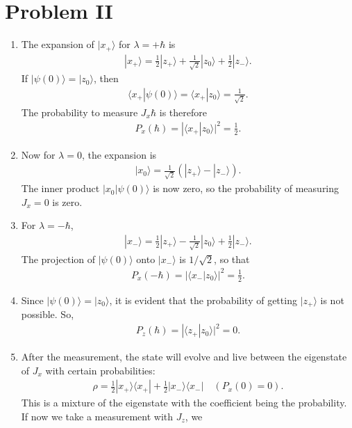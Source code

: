 \documentclass[letterpaper,11pt,twoside]{article}
\newcommand{\ket}[1]{|#1\rangle}
\newcommand{\bra}[1]{\langle#1|}
\newcommand{\braket}[1]{\langle#1\rangle}
\begin{document}
\section*{Problem II}
\begin{enumerate}[itemsep=0pt,topsep=0pt,label=\alph*)]
  \item The expansion of $\ket{x_+}$ for $\lambda=+\hbar$ is 
  \begin{align*}
    \ket{x_+}=\frac{1}{2}\ket{z_+}+\frac{1}{\sqrt{2}}\ket{z_0}+\frac{1}{2}\ket{z_-}.
  \end{align*}
  If $\ket{\psi(0)}=\ket{z_0}$, then 
  \begin{align*}
    \braket{x_+|\psi(0)}=\braket{x_+|z_0}=\frac{1}{\sqrt{2}}.
  \end{align*}
  The probability to measure $J_x\hbar$ is therefore 
  \begin{align*}
    P_x(\hbar)=|\braket{x_+|z_0}|^2=\frac{1}{2}.
  \end{align*}
  \item Now for $\lambda=0$, the expansion is 
  \begin{align*}
    \ket{x_0}=\frac{1}{\sqrt{2}}(\ket{z_+}-\ket{z_-}).
  \end{align*}
  The inner product $\ket{x_0|\psi(0)}$ is now zero, so the probability of measuring $J_x=0$ is zero.
  \item For $\lambda=-\hbar$, 
  \begin{align*}
    \ket{x_-}=\frac{1}{2}\ket{z_+}-\frac{1}{\sqrt{2}}\ket{z_0}+\frac{1}{2}\ket{z_-}.
  \end{align*}
  The projection of $\ket{\psi(0)}$ onto $\ket{x_-}$ is $1/\sqrt{2}$, so that 
  \begin{align*}
    P_x(-\hbar)=|\braket{x_-|z_0}|^2=\frac{1}{2}.
  \end{align*}
  \item Since $\ket{\psi(0)}=\ket{z_0}$, it is evident that the probability of getting $\ket{z_+}$ is not possible. So,
  \begin{align*}
    P_z(\hbar)=|\braket{z_+|z_0}|^2=0.
  \end{align*}
  \item After the measurement, the state will evolve and live between the eigenstate of $J_x$ with certain probabilities:
  \begin{align*}
    \rho=\frac{1}{2}\ket{x_+}\bra{x_+}+\frac{1}{2}\ket{x_-}\bra{x_-}\quad(P_x(0)=0).
  \end{align*}
  This is a mixture of the eigenstate with the coefficient being the probability. If now we take a measurement with $J_z$, we 

\end{enumerate}
\end{document}
